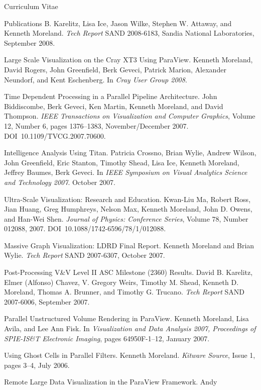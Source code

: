 \documentclass{article}
\begin{document}
\begin{cv}{Curriculum Vitae}
\begin{cvlist}{Publications}
      B. Karelitz, Lisa Ice, Jason Wilke, Stephen W. Attaway, and Kenneth
      Moreland. \emph{Tech Report} SAND 2008-6183, Sandia National
      Laboratories, September 2008.
    \item[Large Scale Visualization on the Cray XT3 Using ParaView.]
      Kenneth Moreland, David Rogers, John Greenfield, Berk Geveci, Patrick
      Marion, Alexander Neundorf, and Kent Eschenberg. In \emph{Cray User
        Group 2008}.
    \item[Time Dependent Processing in a Parallel Pipeline Architecture.]
      John Biddiscombe, Berk Geveci, Ken Martin, Kenneth Moreland, and
      David Thompson.  \emph{IEEE Transactions on Visualization and
        Computer Graphics}, Volume 12, Number 6, pages 1376--1383,
      November/December 2007.  DOI~10.1109/TVCG.2007.70600.
    \item[Intelligence Analysis Using Titan.] Patricia Crossno, Brian
      Wylie, Andrew Wilson, John Greenfield, Eric Stanton, Timothy Shead,
      Lisa Ice, Kenneth Moreland, Jeffrey Baumes, Berk Geveci. In
      \emph{IEEE Symposium on Visual Analytics Science and Technology
        2007}. October 2007.
    \item[Ultra-Scale Visualization: Research and Education.] Kwan-Liu Ma,
      Robert Ross, Jian Huang, Greg Humphreys, Nelson Max, Kenneth
      Moreland, John D. Owens, and Han-Wei Shen. \emph{Journal of Physics:
        Conference Series}, Volume 78, Number 012088,
      2007. DOI~10.1088/1742-6596/78/1/012088.
    \item[Massive Graph Visualization: LDRD Final Report.] Kenneth Moreland
      and Brian Wylie.  \emph{Tech Report} SAND 2007-6307, October 2007.
    \item[Post-Processing V\&V Level II ASC Milestone (2360) Results.]
      David B. Karelitz, Elmer (Alfonso) Chavez, V. Gregory Weirs, Timothy
      M. Shead, Kenneth D. Moreland, Thomas A. Brunner, and Timothy
      G. Trucano.  \emph{Tech Report} SAND 2007-6006, September 2007.
    \item[Parallel Unstructured Volume Rendering in ParaView.] Kenneth
      Moreland, Lisa Avila, and Lee Ann Fisk.  In \emph{Visualization and
        Data Analysis 2007, Proceedings of SPIE-IS\&T Electronic Imaging},
      pages 64950F-1--12, January 2007.
    \item[Using Ghost Cells in Parallel Filters.] Kenneth Moreland.
      \emph{Kitware Source}, Issue 1, pages 3--4, July 2006.
    \item[Remote Large Data Visualization in the ParaView Framework.] Andy

\end{cvlist}
\end{cv}
\end{document}
